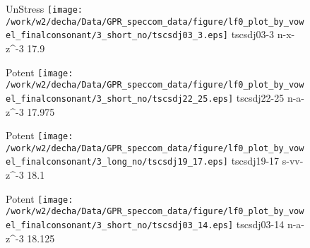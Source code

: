 \documentclass{article}
\begin{document}
\begin{figure}[t]
\begin{minipage}[b]{.24\textwidth}
UnStress
\centering
\texttt{[image: /work/w2/decha/Data/GPR\_speccom\_data/figure/lf0\_plot\_by\_vowel\_finalconsonant/3\_short\_no/tscsdj03\_3.eps]}
tscsdj03-3 n-x-z\textasciicircum-3 17.9
\end{minipage}
\begin{minipage}[b]{.24\textwidth}
\colorbox{Apricot}{Potent}
\centering
\texttt{[image: /work/w2/decha/Data/GPR\_speccom\_data/figure/lf0\_plot\_by\_vowel\_finalconsonant/3\_short\_no/tscsdj22\_25.eps]}
tscsdj22-25 n-a-z\textasciicircum-3 17.975
\end{minipage}
\begin{minipage}[b]{.24\textwidth}
\colorbox{Apricot}{Potent}
\centering
\texttt{[image: /work/w2/decha/Data/GPR\_speccom\_data/figure/lf0\_plot\_by\_vowel\_finalconsonant/3\_long\_no/tscsdj19\_17.eps]}
tscsdj19-17 s-vv-z\textasciicircum-3 18.1
\end{minipage}
\begin{minipage}[b]{.24\textwidth}
\colorbox{Apricot}{Potent}
\centering
\texttt{[image: /work/w2/decha/Data/GPR\_speccom\_data/figure/lf0\_plot\_by\_vowel\_finalconsonant/3\_short\_no/tscsdj03\_14.eps]}
tscsdj03-14 n-a-z\textasciicircum-3 18.125
\end{minipage}
\end{figure}
\end{document}

